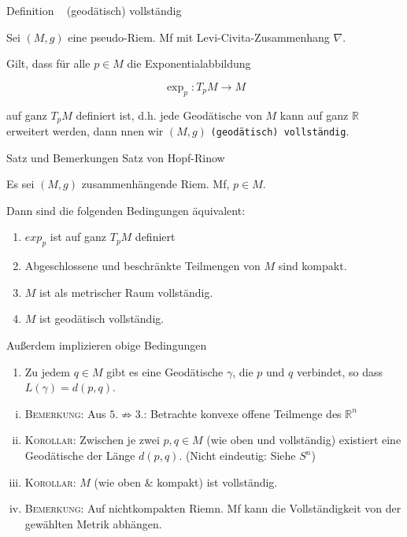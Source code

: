 \documentclass[a6paper,11pt,grid=front]{kartei}
\newcommand{\fl}[1]{\begin{flushleft}
 #1 \end{flushleft}}
\newcommand{\R}{\mathbb{R}}
\newcounter{def}
\newcounter{satz}
\newcommand{\defreset}{\setcounter{def}{1}}
\newcommand{\satzreset}{\setcounter{satz}{1}}
\newcommand{\thisdef}{\thedef\ \stepcounter{def}}
\begin{document}
\defreset
\satzreset
{}


\nonameyet
{Definition \thisdef} {\small (geodätisch) vollständig}
{
	\small
Sei $(M,g)$ eine pseudo-Riem. Mf mit Levi-Civita-Zusammenhang $\nabla$.
\fl{Gilt, dass für alle $p\in M$ die Exponentialabbildung} 
\[
\exp_p : T_pM \to M
\]
\fl{auf ganz $T_pM$ definiert ist, d.h. jede Geodätische von $M$ kann auf 
ganz $\R$ erweitert werden, dann nnen wir $(M,g)$ 
\texttt{(geodätisch) vollständig}.}
}
{}

\nonameyet
{\small Satz und Bemerkungen} {\small Satz von Hopf-Rinow}
{
	\vspace{-2em}
\scriptsize
Es sei $(M,g)$ zusammenhängende Riem. Mf, $p\in M$.
\fl{Dann sind die folgenden Bedingungen äquivalent:}
\begin{enumerate}[1.]
\item $exp_p$ ist auf ganz $T_pM$ definiert
\item Abgeschlossene und beschränkte Teilmengen von $M$ sind kompakt.
\item $M$ ist als metrischer Raum vollständig.
\item $M$ ist geodätisch vollständig.
\end{enumerate}
\fl{Außerdem implizieren obige Bedingungen}
\begin{enumerate}[5.]
\item Zu jedem $q\in M$ gibt es eine Geodätische $\gamma$, die $p$ und $q$
verbindet, so dass $L(\gamma) = d(p,q)$.
\end{enumerate}

\begin{enumerate}[(i)]
\item \textsc{Bemerkung:} Aus $5. \not \Rightarrow 3.$:
Betrachte konvexe offene Teilmenge des $\R^n$
\item \textsc{Korollar:} Zwischen je zwei $p,q \in M$ (wie oben und vollständig)
existiert eine Geodätische der Länge $d(p,q)$. (Nicht eindeutig: Siehe $S^n$)
\item \textsc{Korollar:} $M$ (wie oben \& kompakt) ist vollständig.
\item \textsc{Bemerkung:} Auf nichtkompakten Riemn. Mf kann die Vollständigkeit von der gewählten Metrik abhängen.
\end{enumerate}
}
{}

\end{document}
